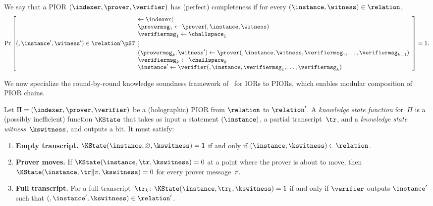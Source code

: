 \begin{definition}
    \label{def:pior-completeness}
    We say that a PIOR $(\indexer,\prover,\verifier)$ has (perfect) completeness if for every $(\index,\instance,\witness) \in \relation$,
    \[
    \Pr\left[ (\index',\instance',\witness') \in \relation' \pST 
    \begin{array}{l}
        \index' \gets \indexer(\index) \\
        \provermsg_1 \gets \prover(\index',\instance,\witness) \\
        \verifiermsg_1 \gets \challspace_1 \\
        \vdots \\
        (\provermsg_k,\witness') \gets \prover(\index',\instance,\witness,\verifiermsg_1,\dotsc,\verifiermsg_{k-1}) \\
        \verifiermsg_k \gets \challspace_k \\
        \instance' \gets \verifier(\index',\instance,\verifiermsg_1,\dotsc,\verifiermsg_{k})
    \end{array}
    \right]
    = 1.
    \]
\end{definition}

We now specialize the round-by-round knowledge soundness framework of~\cite{BCFW25} for IORs to PIORs, which enables modular composition of PIOR chains.

\begin{definition}
\label{def:kstate}
Let $\Pi = (\indexer,\prover,\verifier)$ be a (holographic) PIOR from $\relation$ to $\relation'$. A \emph{knowledge state function} for~$\Pi$ is a (possibly inefficient) function $\KState$ that takes as input a statement $(\index, \instance)$, a partial transcript~$\tr$, and a \emph{knowledge state witness}~$\kswitness$, and outputs a bit. It must satisfy:
\begin{enumerate}[nosep]
  \item \textbf{Empty transcript.} $\KState(\index, \instance, \varnothing, \kswitness) = 1$ if and only if $(\index, \instance, \kswitness) \in \relation$.
  \item \textbf{Prover moves.} If $\KState(\index, \instance, \tr, \kswitness) = 0$ at a point where the prover is about to move, then $\KState(\index, \instance, \tr \| \pi, \kswitness) = 0$ for every prover message~$\pi$.
  \item \textbf{Full transcript.} For a full transcript~$\tr_k$: $\KState(\index, \instance, \tr_k, \kswitness) = 1$ if and only if $\verifier$ outputs $\instance'$ such that $(\index', \instance', \kswitness) \in \relation'$.
\end{enumerate}
\end{definition}

